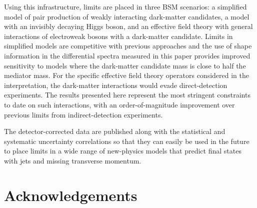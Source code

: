 \documentclass[cernpreprint,txfonts,UKenglish,texlive=2016]{\ATLASLATEXPATH atlasdoc}
\begin{document}
Using this infrastructure, limits are placed in three BSM scenarios: 
a simplified model of pair production of weakly interacting dark-matter candidates,
a model with an invisibly decaying Higgs boson, and an effective field theory
with general interactions of electroweak bosons with a dark-matter candidate.
Limits in simplified models are competitive with previous approaches and
the use of shape information in the differential spectra measured in this paper provides 
improved sensitivity to models where the dark-matter candidate mass is close to half the mediator mass.
For the specific effective field theory operators considered in the interpretation, the dark-matter
interactions would evade direct-detection experiments. 
The results presented here represent the most stringent constraints to date on such interactions, with an order-of-magnitude improvement over previous limits from indirect-detection experiments.


The detector-corrected data are published along with the statistical
and systematic uncertainty correlations so that they can easily be used in the future 
to place limits in a wide range of new-physics models that predict final states with jets and missing transverse momentum.

\section*{Acknowledgements}



\printbibliography
\newpage 
 
\end{document}

